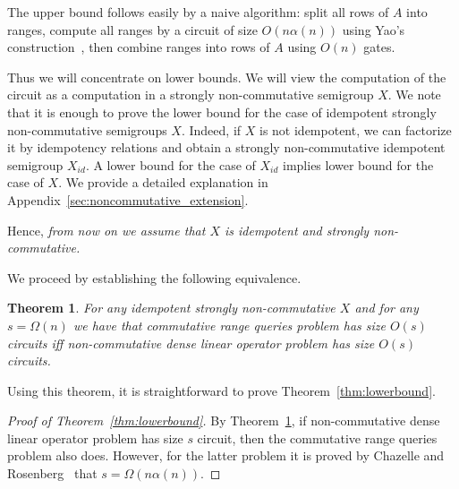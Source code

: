 \documentclass[11pt,letterpaper]{article}
\newtheorem{theorem}{Theorem}
\begin{document}

The upper bound follows easily by a naive algorithm: split all rows of $A$ into ranges, compute all ranges by a circuit of size $O(n\alpha(n))$ using Yao's construction~\cite{DBLP:conf/stoc/Yao82}, then combine ranges into rows of $A$ using $O(n)$ gates.

Thus we will concentrate on lower bounds. We will view the computation of the circuit as a computation in a strongly non-commutative semigroup $X$. We note that it is enough to prove the lower bound for the case of idempotent strongly non-commutative semigroups $X$. Indeed, if $X$ is not idempotent, we can factorize it by idempotency relations and obtain a strongly non-commutative idempotent semigroup $X_{id}$. A lower bound for the case of $X_{id}$ implies lower bound for the case of $X$. We provide a detailed explanation in Appendix~\ref{sec:noncommutative_extension}.

Hence, {\em from now on we assume that $X$ is idempotent and strongly non-commutative.}

We proceed by establishing the following equivalence.

\begin{theorem}\label{thm:equivalence}
For any idempotent strongly non-commutative $X$ and for any $s=\Omega(n)$ we have that commutative range queries problem has size $O(s)$ circuits iff non-commutative dense linear operator problem has size $O(s)$ circuits.
\end{theorem}

Using this theorem, it is straightforward to prove
Theorem~\ref{thm:lowerbound}.

\begin{proof}[Proof of Theorem~\ref{thm:lowerbound}]
By Theorem~\ref{thm:equivalence}, if non-commutative dense linear operator problem has size $s$ circuit, then the commutative range queries problem also does. However, for the latter problem it is proved by Chazelle and Rosenberg~\cite{DBLP:journals/ijcga/ChazelleR91} that $s=\Omega(n \alpha(n))$.
\end{proof}
\end{document}
